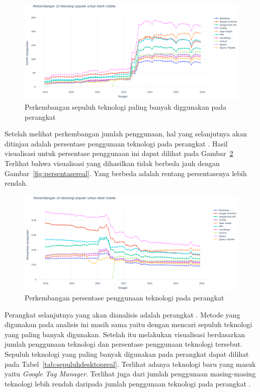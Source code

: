 \begin{figure}[H]
    \centering
    \includegraphics[width=0.7\linewidth]{Gambar/perkembanganmobilereal.png}
    \caption{Perkembangan sepuluh teknologi paling banyak diggunakan pada perangkat \mobile}
    \label{fig:sepuluhmobilereal}
\end{figure}

Setelah melihat perkembangan jumlah penggunaan, hal yang selanjutnya akan ditinjau adalah persentase penggunaan teknologi pada perangkat \mobile. Hasil visualisasi untuk persentase penggunaan ini dapat dilihat pada Gambar~\ref{fig:persentasemobilereal} Terlihat bahwa visualisasi yang dihasilkan tidak berbeda jauh dengan Gambar~\ref{fig:persentasereal}. Yang berbeda adalah rentang persentasenya lebih rendah.

\begin{figure}[H]
    \centering
    \includegraphics[width=0.7\linewidth]{Gambar/persentasemobilereal.png}
    \caption{Perkembangan persentase penggunaan teknologi pada perangkat \mobile}
    \label{fig:persentasemobilereal}
\end{figure}

Perangkat selanjutnya yang akan dianalisis adalah perangkat \desktop. Metode yang digunakan pada analisis ini masih sama yaitu dengan mencari sepuluh teknologi yang paling banyak digunakan.  Setelah itu melakukan visualisasi berdasarkan jumlah penggunaan teknologi dan persentase penggunaan teknologi tersebut. Sepuluh teknologi yang paling banyak digunakan pada perangkat \desktop dapat dilihat pada Tabel~\ref{tab:sepuluhdesktopreal}. Terlihat adanya teknologi baru yang masuk yaitu \textit{Google Tag Manager}. Terlihat juga dari jumlah penggunaan masing-masing teknologi lebih rendah daripada jumlah penggunaan teknologi pada perangkat \mobile. 

